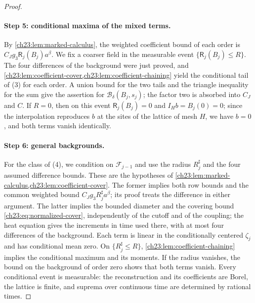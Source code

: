 \begin{proof}
\paragraph{Step 5: conditional maxima of the mixed terms.}
By \cref{ch23:lem:marked-calculus}, the weighted coefficient bound of each order is $C_Jg_3\mathsf R_j(B_j)a^\beta$. We fix a coarser field in the measurable event $\{\mathsf R_j(B_j)\le R\}$. The four differences of the background were just proved, and \cref{ch23:lem:coefficient-cover,ch23:lem:coefficient-chaining} yield the conditional tail of (3) for each order. A union bound for the two tails and the triangle inequality for the sum give the assertion for $\mathcal B_\delta(B_j,s_j)$; the factor two is absorbed into $C_J$ and $C$. If $R=0$, then on this event $\mathsf R_j(B_j)=0$ and $I_Hb=B_j(0)=0$; since the interpolation reproduces $b$ at the sites of the lattice of mesh $H$, we have $b=0$, and both terms vanish identically.

\paragraph{Step 6: general backgrounds.}
For the class of (4), we condition on $\mathcal F_{j-1}$ and use the radius $R_j^\sharp$ and the four assumed difference bounds. These are the hypotheses of \cref{ch23:lem:marked-calculus,ch23:lem:coefficient-cover}. The former implies both row bounds and the common weighted bound $C_Jg_3R_j^\sharp a^\beta$; its proof treats the difference in either argument. The latter implies the bounded diameter and the covering bound \eqref{ch23:eq:normalized-cover}, independently of the cutoff and of the coupling; the heat equation gives the increments in time used there, with at most four differences of the background. Each term is linear in the conditionally centered $\zeta_j$ and has conditional mean zero. On $\{R_j^\sharp\le R\}$, \cref{ch23:lem:coefficient-chaining} implies the conditional maximum and its moments. If the radius vanishes, the bound on the background of order zero shows that both terms vanish. Every conditional event is measurable: the reconstruction and its coefficients are Borel, the lattice is finite, and suprema over continuous time are determined by rational times.


\end{proof}
